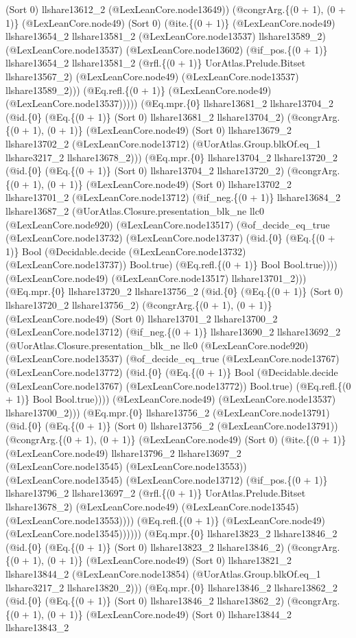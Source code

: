 \documentclass[11pt]{article}
\begin{document}
(Sort 0) llshare13612\_2 (@LexLeanCore.node13649)) (@congrArg.\{(0 + 1), (0 + 1)\} (@LexLeanCore.node49) (Sort 0) (@ite.\{(0 + 1)\} (@LexLeanCore.node49) llshare13654\_2 llshare13581\_2 (@LexLeanCore.node13537) llshare13589\_2) (@LexLeanCore.node13537) (@LexLeanCore.node13602) (@if\_pos.\{(0 + 1)\} llshare13654\_2 llshare13581\_2 (@rfl.\{(0 + 1)\} UorAtlas.Prelude.Bitset llshare13567\_2) (@LexLeanCore.node49) (@LexLeanCore.node13537) llshare13589\_2))) (@Eq.refl.\{(0 + 1)\} (@LexLeanCore.node49) (@LexLeanCore.node13537))))) (@Eq.mpr.\{0\} llshare13681\_2 llshare13704\_2 (@id.\{0\} (@Eq.\{(0 + 1)\} (Sort 0) llshare13681\_2 llshare13704\_2) (@congrArg.\{(0 + 1), (0 + 1)\} (@LexLeanCore.node49) (Sort 0) llshare13679\_2 llshare13702\_2 (@LexLeanCore.node13712) (@UorAtlas.Group.blkOf.eq\_1 llshare3217\_2 llshare13678\_2))) (@Eq.mpr.\{0\} llshare13704\_2 llshare13720\_2 (@id.\{0\} (@Eq.\{(0 + 1)\} (Sort 0) llshare13704\_2 llshare13720\_2) (@congrArg.\{(0 + 1), (0 + 1)\} (@LexLeanCore.node49) (Sort 0) llshare13702\_2 llshare13701\_2 (@LexLeanCore.node13712) (@if\_neg.\{(0 + 1)\} llshare13684\_2 llshare13687\_2 (@UorAtlas.Closure.presentation\_blk\_ne llc0 (@LexLeanCore.node920) (@LexLeanCore.node13517) (@of\_decide\_eq\_true (@LexLeanCore.node13732) (@LexLeanCore.node13737) (@id.\{0\} (@Eq.\{(0 + 1)\} Bool (@Decidable.decide (@LexLeanCore.node13732) (@LexLeanCore.node13737)) Bool.true) (@Eq.refl.\{(0 + 1)\} Bool Bool.true)))) (@LexLeanCore.node49) (@LexLeanCore.node13517) llshare13701\_2))) (@Eq.mpr.\{0\} llshare13720\_2 llshare13756\_2 (@id.\{0\} (@Eq.\{(0 + 1)\} (Sort 0) llshare13720\_2 llshare13756\_2) (@congrArg.\{(0 + 1), (0 + 1)\} (@LexLeanCore.node49) (Sort 0) llshare13701\_2 llshare13700\_2 (@LexLeanCore.node13712) (@if\_neg.\{(0 + 1)\} llshare13690\_2 llshare13692\_2 (@UorAtlas.Closure.presentation\_blk\_ne llc0 (@LexLeanCore.node920) (@LexLeanCore.node13537) (@of\_decide\_eq\_true (@LexLeanCore.node13767) (@LexLeanCore.node13772) (@id.\{0\} (@Eq.\{(0 + 1)\} Bool (@Decidable.decide (@LexLeanCore.node13767) (@LexLeanCore.node13772)) Bool.true) (@Eq.refl.\{(0 + 1)\} Bool Bool.true)))) (@LexLeanCore.node49) (@LexLeanCore.node13537) llshare13700\_2))) (@Eq.mpr.\{0\} llshare13756\_2 (@LexLeanCore.node13791) (@id.\{0\} (@Eq.\{(0 + 1)\} (Sort 0) llshare13756\_2 (@LexLeanCore.node13791)) (@congrArg.\{(0 + 1), (0 + 1)\} (@LexLeanCore.node49) (Sort 0) (@ite.\{(0 + 1)\} (@LexLeanCore.node49) llshare13796\_2 llshare13697\_2 (@LexLeanCore.node13545) (@LexLeanCore.node13553)) (@LexLeanCore.node13545) (@LexLeanCore.node13712) (@if\_pos.\{(0 + 1)\} llshare13796\_2 llshare13697\_2 (@rfl.\{(0 + 1)\} UorAtlas.Prelude.Bitset llshare13678\_2) (@LexLeanCore.node49) (@LexLeanCore.node13545) (@LexLeanCore.node13553)))) (@Eq.refl.\{(0 + 1)\} (@LexLeanCore.node49) (@LexLeanCore.node13545)))))) (@Eq.mpr.\{0\} llshare13823\_2 llshare13846\_2 (@id.\{0\} (@Eq.\{(0 + 1)\} (Sort 0) llshare13823\_2 llshare13846\_2) (@congrArg.\{(0 + 1), (0 + 1)\} (@LexLeanCore.node49) (Sort 0) llshare13821\_2 llshare13844\_2 (@LexLeanCore.node13854) (@UorAtlas.Group.blkOf.eq\_1 llshare3217\_2 llshare13820\_2))) (@Eq.mpr.\{0\} llshare13846\_2 llshare13862\_2 (@id.\{0\} (@Eq.\{(0 + 1)\} (Sort 0) llshare13846\_2 llshare13862\_2) (@congrArg.\{(0 + 1), (0 + 1)\} (@LexLeanCore.node49) (Sort 0) llshare13844\_2 llshare13843\_2 
\end{document}
